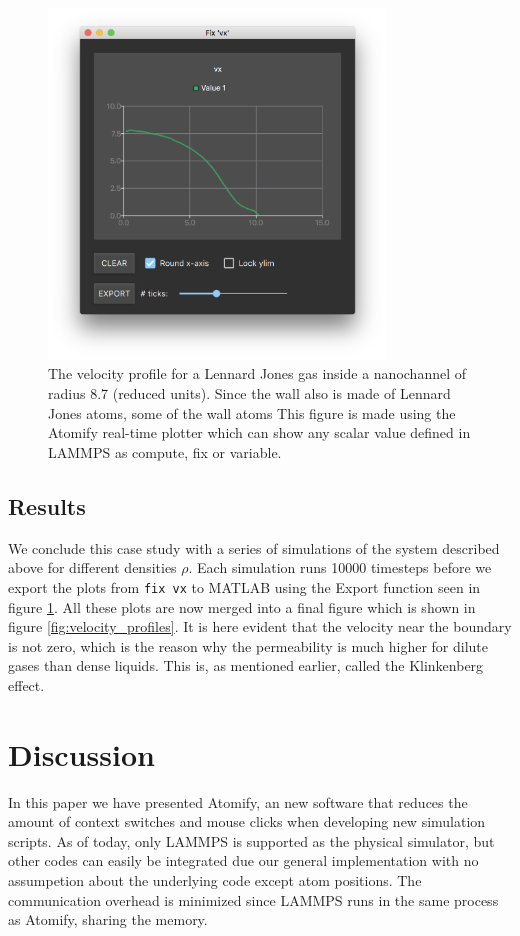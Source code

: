 \documentclass[12pt,a4paper,final]{iopart}
\newcommand{\code}[1]{\colorbox{light-gray}{\color{RawSienna}\texttt{#1}}}
\begin{document}
\begin{figure}
	\centering
	\includegraphics[width=0.8\textwidth]{lj_flow/08_velocity_profile1.png}
	\caption{
		The velocity profile for a Lennard Jones gas inside a nanochannel of radius 8.7 (reduced units).
		Since the wall also is made of Lennard Jones atoms, some of the wall atoms
		This figure is made using the Atomify real-time plotter which can show any scalar value defined in LAMMPS
		as compute, fix or variable.
    }
	\label{fig:velocity_profile1}
\end{figure}
\subsection{Results}
We conclude this case study with a series of simulations of the system described above for different densities $\rho$.
Each simulation runs 10000 timesteps before we export the plots from \code{fix vx} to MATLAB using the Export function seen in figure \ref{fig:velocity_profile1}.
All these plots are now merged into a final figure which is shown in figure \ref{fig:velocity_profiles}.
It is here evident that the velocity near the boundary is not zero, which is the reason why the permeability is much higher for dilute gases than dense liquids.
This is, as mentioned earlier, called the Klinkenberg effect\cite{klinkenberg1941permeability}.

\section{\label{sec:discussion}Discussion}
In this paper we have presented Atomify, an new software that reduces the amount of context switches and mouse clicks
when developing new simulation scripts.
As of today, only LAMMPS is supported as the physical simulator, but other codes can easily be integrated
due our general implementation with no assumpetion about the underlying code except atom positions.
The communication overhead is minimized since LAMMPS runs in the same process as Atomify, sharing the memory.
\end{document}
